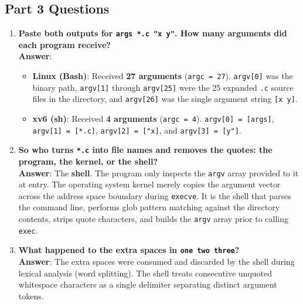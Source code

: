 \documentclass[12pt,a4paper]{article}
\begin{document}
\subsection{Part 3 Questions}
\begin{enumerate}
    \item \textbf{Paste both outputs for \texttt{args *.c "x y"}. How many arguments did each program receive?} \\
    \textbf{Answer}:
    \begin{itemize}
        \item \textbf{Linux (Bash)}: Received \textbf{27 arguments} (\texttt{argc = 27}). \texttt{argv[0]} was the binary path, \texttt{argv[1]} through \texttt{argv[25]} were the 25 expanded \texttt{.c} source files in the directory, and \texttt{argv[26]} was the single argument string \texttt{[x y]}.
        \item \textbf{xv6 (sh)}: Received \textbf{4 arguments} (\texttt{argc = 4}). \texttt{argv[0] = [args]}, \texttt{argv[1] = [*.c]}, \texttt{argv[2] = ["x]}, and \texttt{argv[3] = [y"]}.
    \end{itemize}

    \item \textbf{So who turns \texttt{*.c} into file names and removes the quotes: the program, the kernel, or the shell?} \\
    \textbf{Answer}: The \textbf{shell}. The program only inspects the \texttt{argv} array provided to it at entry. The operating system kernel merely copies the argument vector across the address space boundary during \texttt{execve}. It is the shell that parses the command line, performs glob pattern matching against the directory contents, strips quote characters, and builds the \texttt{argv} array prior to calling \texttt{exec}.

    \item \textbf{What happened to the extra spaces in \texttt{one   two      three}?} \\
    \textbf{Answer}: The extra spaces were consumed and discarded by the shell during lexical analysis (word splitting). The shell treats consecutive unquoted whitespace characters as a single delimiter separating distinct argument tokens.
\end{enumerate}
\end{document}
